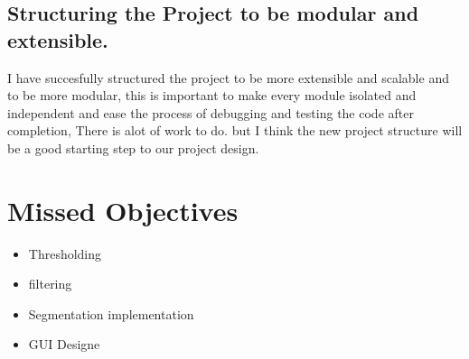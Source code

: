 \documentclass[10pt, b5paper]{article}
\begin{document}
\subsection{Structuring the Project to be modular and extensible.}
I have succesfully structured the project to be more extensible and scalable and to be more modular, this is important to make every module isolated and independent and ease the process of debugging and testing the code after completion, There is alot of work to do. but I think the new project structure will be a good starting step to our project design.


\section{Missed Objectives}
\begin{itemize}
\item Thresholding 
\item filtering
\item Segmentation implementation
\item GUI Designe
\end{itemize}

 



    
   
    
\end{document}
